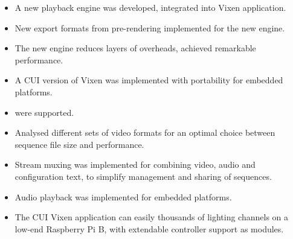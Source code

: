 

\begin{itemize}[noitemsep]
  \item A new playback engine was developed, integrated into Vixen application.
  \item New export formats from pre-rendering implemented for the new engine.
  \item The new engine reduces layers of overheads, achieved remarkable performance.
  \item A CUI version of Vixen was implemented with portability for embedded platforms.
  \item {} were supported.
  \item Analysed different sets of video formats for an optimal choice between sequence file size and performance.
  \item Stream muxing was implemented for combining video, audio and configuration text, to simplify management and sharing of sequences.
  \item Audio playback was implemented for embedded platforms.
  \item The CUI Vixen application can easily  thousands of lighting channels on a low-end Raspberry Pi B, with extendable controller support as modules.
\end{itemize}
